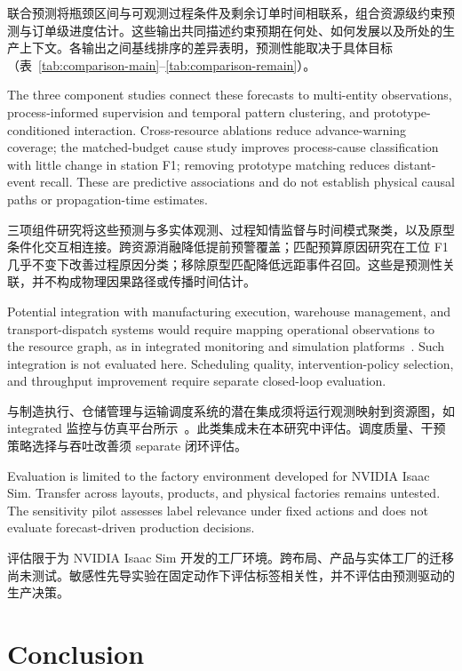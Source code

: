 \documentclass[a4paper,fleqn]{cas-dc}
\newcommand{\zhpara}[1]{%
  \par\begingroup\small\color{black!72}\noindent #1\par\endgroup}
\begin{document}
\zhpara{联合预测将瓶颈区间与可观测过程条件及剩余订单时间相联系，组合资源级约束预测与订单级进度估计。这些输出共同描述约束预期在何处、如何发展以及所处的生产上下文。各输出之间基线排序的差异表明，预测性能取决于具体目标（表~\ref{tab:comparison-main}--\ref{tab:comparison-remain}）。}


The three component studies connect these forecasts to multi-entity observations, process-informed supervision and temporal pattern clustering, and prototype-conditioned interaction. Cross-resource ablations reduce advance-warning coverage; the matched-budget cause study improves process-cause classification with little change in station F1; removing prototype matching reduces distant-event recall. These are predictive associations and do not establish physical causal paths or propagation-time estimates.

\zhpara{三项组件研究将这些预测与多实体观测、过程知情监督与时间模式聚类，以及原型条件化交互相连接。跨资源消融降低提前预警覆盖；匹配预算原因研究在工位 F1 几乎不变下改善过程原因分类；移除原型匹配降低远距事件召回。这些是预测性关联，并不构成物理因果路径或传播时间估计。}


Potential integration with manufacturing execution, warehouse management, and transport-dispatch systems would require mapping operational observations to the resource graph, as in integrated monitoring and simulation platforms~\cite{leng2023monitoring}. Such integration is not evaluated here. Scheduling quality, intervention-policy selection, and throughput improvement require separate closed-loop evaluation.

\zhpara{与制造执行、仓储管理与运输调度系统的潜在集成须将运行观测映射到资源图，如 integrated 监控与仿真平台所示~\cite{leng2023monitoring}。此类集成未在本研究中评估。调度质量、干预策略选择与吞吐改善须 separate 闭环评估。}


Evaluation is limited to the factory environment developed for NVIDIA Isaac Sim. Transfer across layouts, products, and physical factories remains untested. The sensitivity pilot assesses label relevance under fixed actions and does not evaluate forecast-driven production decisions.

\zhpara{评估限于为 NVIDIA Isaac Sim 开发的工厂环境。跨布局、产品与实体工厂的迁移尚未测试。敏感性先导实验在固定动作下评估标签相关性，并不评估由预测驱动的生产决策。}


\section{Conclusion}\label{sec:conclusion}
\end{document}
